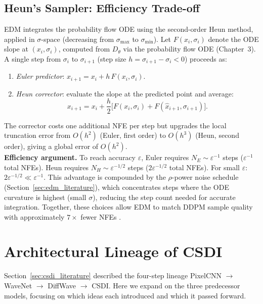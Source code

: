 \subsection{Heun's Sampler: Efficiency Trade-off}
\label{app:subsec:heun}

EDM \cite{karras2022elucidating} integrates the probability flow ODE using
the second-order Heun method, applied in $\sigma$-space (decreasing from
$\sigma_{\max}$ to $\sigma_{\min}$). Let $F(x_i,\sigma_i)$ denote the ODE
slope at $(x_i, \sigma_i)$, computed from $D_\theta$ via the probability flow
ODE (Chapter~3). A single step from $\sigma_i$ to $\sigma_{i+1}$ (step size
$h = \sigma_{i+1} - \sigma_i < 0$) proceeds as:
\begin{enumerate}
    \item \textit{Euler predictor}:
    $\hat{x}_{i+1} = x_i + h\,F(x_i,\sigma_i)$.
    \item \textit{Heun corrector}: evaluate the slope at the predicted point
    and average:
    \[
        x_{i+1} = x_i + \frac{h}{2}\bigl[
        F(x_i,\sigma_i) + F(\hat{x}_{i+1},\sigma_{i+1})\bigr].
    \]
\end{enumerate}
The corrector costs one additional NFE per step but upgrades the local
truncation error from $O(h^2)$ (Euler, first order) to $O(h^3)$ (Heun,
second order), giving a global error of $O(h^2)$.\\

\textbf{Efficiency argument.} To reach accuracy $\varepsilon$, Euler requires
$N_E \sim \varepsilon^{-1}$ steps ($\varepsilon^{-1}$ total NFEs). Heun
requires $N_H \sim \varepsilon^{-1/2}$ steps ($2\varepsilon^{-1/2}$ total NFEs).
For small $\varepsilon$: $2\varepsilon^{-1/2} \ll \varepsilon^{-1}$. This
advantage is compounded by the $\rho$-power noise schedule
(Section~\ref{sec:edm_literature}), which concentrates steps where the ODE
curvature is highest (small $\sigma$), reducing the step count needed for
accurate integration. Together, these choices allow EDM to match DDPM sample
quality with approximately $7\times$ fewer NFEs \cite{karras2022elucidating}.

\section{Architectural Lineage of CSDI}
\label{app:sec:arch_lineage}

Section~\ref{sec:csdi_literature} described the four-step lineage PixelCNN
$\to$ WaveNet $\to$ DiffWave $\to$ CSDI. Here we expand on the three
predecessor models, focusing on which ideas each introduced and which it
passed forward.

